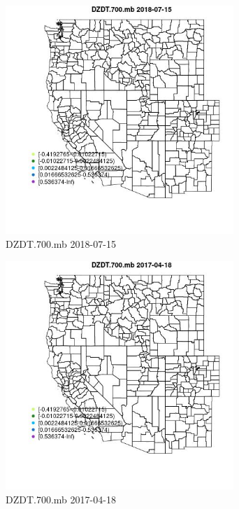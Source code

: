\begin{figure} 
\centering  
\includegraphics[width=0.77\textwidth]{Code_Outputs/Report_ML_input_PM25_Step4_part_e_de_duplicated_aveswNAs_MapObsDZDT700mb2018-07-15.jpg} 
\caption{\label{fig:Report_ML_input_PM25_Step4_part_e_de_duplicated_aveswNAsMapObsDZDT700mb2018-07-15}DZDT.700.mb 2018-07-15} 
\end{figure} 
 

\begin{figure} 
\centering  
\includegraphics[width=0.77\textwidth]{Code_Outputs/Report_ML_input_PM25_Step4_part_e_de_duplicated_aveswNAs_MapObsDZDT700mb2017-04-18.jpg} 
\caption{\label{fig:Report_ML_input_PM25_Step4_part_e_de_duplicated_aveswNAsMapObsDZDT700mb2017-04-18}DZDT.700.mb 2017-04-18} 
\end{figure} 
 
